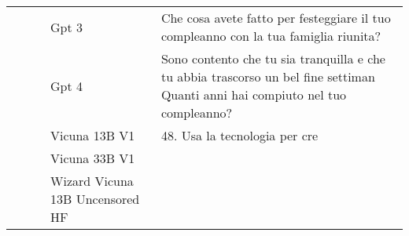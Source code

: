 \begin{center}
\begin{longtable}{l|l|l|p{3cm}|p{8cm}}
 &  &  & Gpt 3 & Che cosa avete fatto per festeggiare il tuo compleanno con la tua famiglia riunita? \\
 &  &  & Gpt 4 & Sono contento che tu sia tranquilla e che tu abbia trascorso un bel fine settiman Quanti anni hai compiuto nel tuo compleanno? \\
 &  &  & Vicuna 13B V1 & 48. Usa la tecnologia per cre \\
 &  &  & Vicuna 33B V1 &  \\
 &  &  & Wizard Vicuna 13B Uncensored HF &  \\
\bottomrule

\end{longtable}

\end{center}
